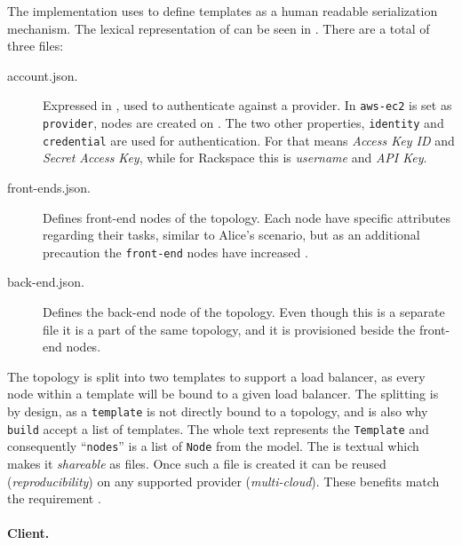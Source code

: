 The implementation uses  to define templates as a human readable serialization mechanism.
The lexical representation of  can be seen in .
There are a total of three files:
\begin{description}
  \item[account.json.]
    Expressed in , used to authenticate against a provider.
    In  \texttt{aws-ec2} is set as \texttt{provider},
    \ie nodes are created on .
    The two other properties, \texttt{identity} and \texttt{credential} are used for authentication.
    For  that means \emph{Access Key ID} and \emph{Secret Access Key},
    while for Rackspace this is \emph{username} and \emph{API Key}.
  \item[front-ends.json.]
    Defines front-end nodes of the topology.
    Each node have specific attributes regarding their tasks, similar to Alice's scenario,
    but as an additional precaution the \texttt{front-end} nodes have increased .
  \item[back-end.json.]
    Defines the back-end node of the topology.
    Even though this is a separate file it is a part of the same topology,
    and it is provisioned beside the front-end nodes.
\end{description}
The topology is split into two templates to support a load balancer,
as every node within a template will be bound to a given load balancer.
The splitting is by design, as a \texttt{template} is not directly bound to a topology,
and is also why \texttt{build} accept a list of templates.
The whole text represents the \texttt{Template} and consequently 
``\texttt{nodes}'' is a list of \texttt{Node} from the model.
The  is textual which makes it \emph{shareable} as files.
Once such a file is created it can be reused (\emph{reproducibility}) 
on any supported provider (\emph{multi-cloud}).
These benefits match the requirement .

\paragraph{Client.}



